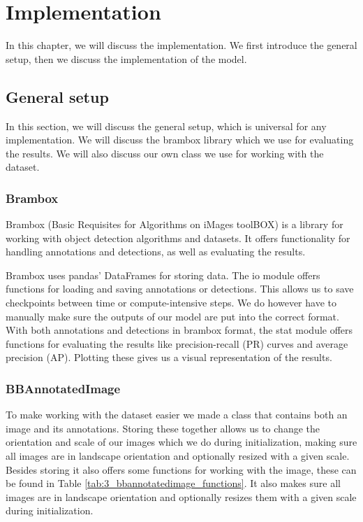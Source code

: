  
\chapter{Implementation}
In this chapter, we will discuss the implementation. We first introduce the general setup, then we discuss the implementation of the model.


\section{General setup}
In this section, we will discuss the general setup, which is universal for any implementation. We will discuss the brambox library which we use for evaluating the results. We will also discuss our own class we use for working with the dataset.

\subsection{Brambox}
Brambox \citep{brambox} (Basic Requisites for Algorithms on iMages toolBOX) is a library for working with object detection algorithms and datasets. It offers functionality for handling annotations and detections, as well as evaluating the results. 

Brambox uses pandas' DataFrames for storing data. The io module offers functions for loading and saving annotations or detections. This allows us to save checkpoints between time or compute-intensive steps. We do however have to manually make sure the outputs of our model are put into the correct format. With both annotations and detections in brambox format, the stat module offers functions for evaluating the results like precision-recall (PR) curves and average precision (AP). Plotting these gives us a visual representation of the results.

\subsection{BBAnnotatedImage}
To make working with the dataset easier we made a class that contains both an image and its annotations. Storing these together allows us to change the orientation and scale of our images which we do during initialization, making sure all images are in landscape orientation and optionally resized with a given scale. Besides storing it also offers some functions for working with the image, these can be found in Table \ref{tab:3_bbannotatedimage_functions}. It also makes sure all images are in landscape orientation and optionally resizes them with a given scale during initialization.

